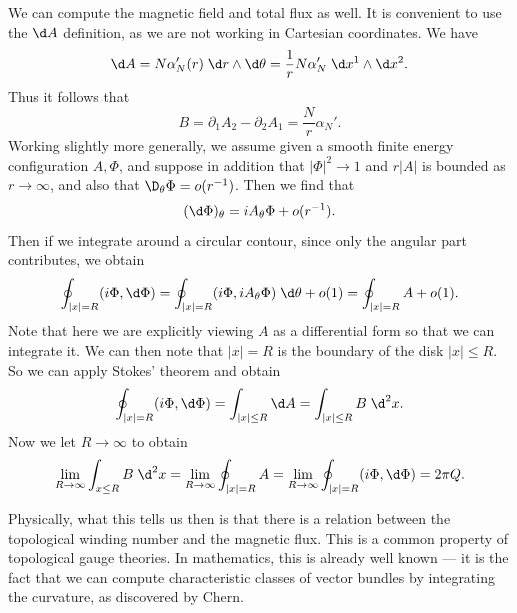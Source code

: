 \documentclass[a4paper]{article}
\begin{document}
We can compute the magnetic field and total flux as well. It is convenient to use the $\d A$ definition, as we are not working in Cartesian coordinates. We have
\[
  \d A = N \alpha_N'(r) \;\d r \wedge \d \theta = \frac{1}{r} N \alpha_N'\;\d x^1 \wedge \d x^2.
\]
Thus it follows that
\[
  B = \partial_1 A_2 - \partial_2 A_1 = \frac{N}{r} \alpha_N'.
\]
Working slightly more generally, we assume given a smooth finite energy configuration $A, \Phi$, and suppose in addition that $|\Phi|^2 \to 1$ and $r|A|$ is bounded as $r \to \infty$, and also that $\D_\theta \Phi = o(r^{-1})$. Then we find that
\[
  (\d \Phi)_\theta = i A_\theta \Phi + o(r^{-1}).
\]
Then if we integrate around a circular contour, since only the angular part contributes, we obtain
\[
  \oint_{|x| = R} (i \Phi, \d \Phi) = \oint_{|x| = R} (i \Phi, i A_\theta \Phi)\;\d \theta + o(1) = \oint_{|x| = R} A + o(1).
\]
Note that here we are explicitly viewing $A$ as a differential form so that we can integrate it. We can then note that $|x| = R$ is the boundary of the disk $|x| \leq R$. So we can apply Stokes' theorem and obtain
\[
  \oint_{|x| = R} (i \Phi, \d \Phi) = \int_{|x| \leq R} \d A = \int_{|x| \leq R} B\;\d^2 x.
\]
%
Now we let $R \to \infty$ to obtain
\[
  \lim_{R \to \infty} \int_{x \leq R} B\;\d^2 x = \lim_{R \to \infty} \oint_{|x| = R} A = \lim_{R \to \infty} \oint_{|x| = R} (i \Phi, \d \Phi) = 2 \pi Q.
\]

Physically, what this tells us then is that there is a relation between the topological winding number and the magnetic flux. This is a common property of topological gauge theories. In mathematics, this is already well known --- it is the fact that we can compute characteristic classes of vector bundles by integrating the curvature, as discovered by Chern.
\end{document}
